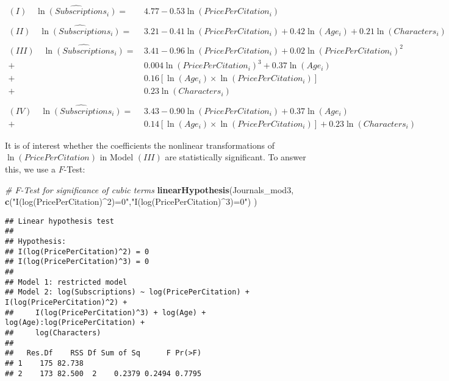 \documentclass[]{book}
\newenvironment{Shaded}{\begin{snugshade}}{\end{snugshade}}
\newcommand{\KeywordTok}[1]{\textcolor[rgb]{0.13,0.29,0.53}{\textbf{#1}}}
\newcommand{\StringTok}[1]{\textcolor[rgb]{0.31,0.60,0.02}{#1}}
\newcommand{\CommentTok}[1]{\textcolor[rgb]{0.56,0.35,0.01}{\textit{#1}}}
\newcommand{\NormalTok}[1]{#1}
\theoremstyle{definition}
\theoremstyle{definition}
\theoremstyle{definition}
\theoremstyle{remark}
\begin{document}
\begin{align*}
  (I)\quad \widehat{\ln(Subscriptions_i)} =& \, 4.77 - 0.53 \ln(PricePerCitation_i) \\
  \\
  (II)\quad \widehat{\ln(Subscriptions_i)} =& \, 3.21 - 0.41 \ln(PricePerCitation_i) + 0.42 \ln(Age_i) + 0.21 \ln(Characters_i) \\
  \\
  (III)\quad \widehat{\ln(Subscriptions_i)} =& \, 3.41 - 0.96 \ln(PricePerCitation_i) + 0.02 \ln(PricePerCitation_i)^2 \\
  +& \, 0.004 \ln(PricePerCitation_i)^3 + 0.37 \ln(Age_i) \\
  +& \, 0.16 \left[\ln(Age_i) \times \ln(PricePerCitation_i)\right] \\ +& \, 0.23 \ln(Characters_i) \\
  \\
  (IV)\quad \widehat{\ln(Subscriptions_i)} =& \, 3.43 - 0.90 \ln(PricePerCitation_i) + 0.37 \ln(Age_i) \\ 
  +&  \, 0.14 \left[\ln(Age_i) \times \ln(PricePerCitation_i)\right] + 0.23 \ln(Characters_i)
\end{align*}

It is of interest whether the coefficients the nonlinear transformations
of \(\ln(PricePerCitation)\) in Model \((III)\) are statistically
significant. To answer this, we use a \(F\)-Test:

\begin{Shaded}
\begin{Highlighting}[]
\CommentTok{# F-Test for significance of cubic terms}
\KeywordTok{linearHypothesis}\NormalTok{(Journals_mod3, }
                 \KeywordTok{c}\NormalTok{(}\StringTok{"I(log(PricePerCitation)^2)=0"}\NormalTok{,}\StringTok{"I(log(PricePerCitation)^3)=0"}\NormalTok{)}
\NormalTok{                 )}
\end{Highlighting}
\end{Shaded}

\begin{verbatim}
## Linear hypothesis test
## 
## Hypothesis:
## I(log(PricePerCitation)^2) = 0
## I(log(PricePerCitation)^3) = 0
## 
## Model 1: restricted model
## Model 2: log(Subscriptions) ~ log(PricePerCitation) + I(log(PricePerCitation)^2) + 
##     I(log(PricePerCitation)^3) + log(Age) + log(Age):log(PricePerCitation) + 
##     log(Characters)
## 
##   Res.Df    RSS Df Sum of Sq      F Pr(>F)
## 1    175 82.738                           
## 2    173 82.500  2    0.2379 0.2494 0.7795
\end{verbatim}
\end{document}
